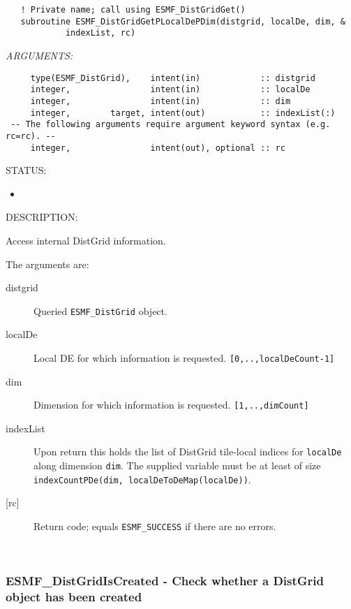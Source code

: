  
\begin{verbatim}   ! Private name; call using ESMF_DistGridGet()
   subroutine ESMF_DistGridGetPLocalDePDim(distgrid, localDe, dim, &
            indexList, rc)\end{verbatim}{\em ARGUMENTS:}
\begin{verbatim}     type(ESMF_DistGrid),    intent(in)            :: distgrid
     integer,                intent(in)            :: localDe
     integer,                intent(in)            :: dim
     integer,        target, intent(out)           :: indexList(:)
 -- The following arguments require argument keyword syntax (e.g. rc=rc). --
     integer,                intent(out), optional :: rc
           \end{verbatim}
{\sf STATUS:}
   \begin{itemize}
   \item{}
   \end{itemize}
  
{\sf DESCRIPTION:\\ }


     Access internal DistGrid information.
  
     The arguments are:
     \begin{description}
     \item[distgrid] 
       Queried {\tt ESMF\_DistGrid} object.
     \item[localDe] 
       Local DE for which information is requested. {\tt [0,..,localDeCount-1]}
     \item[dim] 
       Dimension for which information is requested. {\tt [1,..,dimCount]}
     \item[indexList]
       Upon return this holds the list of DistGrid tile-local indices
       for {\tt localDe} along dimension {\tt dim}. The supplied variable 
       must be at least of size {\tt indexCountPDe(dim, localDeToDeMap(localDe))}.
     \item[{[rc]}] 
       Return code; equals {\tt ESMF\_SUCCESS} if there are no errors.
     \end{description}
   
 
\mbox{}\hrulefill\ 
 
\subsubsection [ESMF\_DistGridIsCreated] {ESMF\_DistGridIsCreated - Check whether a DistGrid object has been created}


